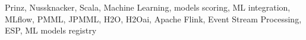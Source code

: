 Prinz, Nussknacker, Scala, Machine Learning, models scoring, ML integration, MLflow, PMML, JPMML, H2O, H2Oai,
Apache Flink, Event Stream Processing, ESP, ML models registry
